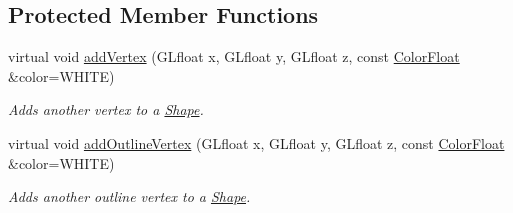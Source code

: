 \subsection*{Protected Member Functions}
\begin{DoxyCompactItemize}
\item 
virtual void \hyperlink{classtsgl_1_1_shape_ac0ea13ecde43ce62262f82597fb94755}{add\+Vertex} (G\+Lfloat x, G\+Lfloat y, G\+Lfloat z, const \hyperlink{structtsgl_1_1_color_float}{Color\+Float} \&color=W\+H\+I\+TE)
\begin{DoxyCompactList}\small\item\em Adds another vertex to a \hyperlink{classtsgl_1_1_shape}{Shape}. \end{DoxyCompactList}\item 
virtual void \hyperlink{classtsgl_1_1_shape_aeb780a6a509ccceae2323508745cd8fd}{add\+Outline\+Vertex} (G\+Lfloat x, G\+Lfloat y, G\+Lfloat z, const \hyperlink{structtsgl_1_1_color_float}{Color\+Float} \&color=W\+H\+I\+TE)
\begin{DoxyCompactList}\small\item\em Adds another outline vertex to a \hyperlink{classtsgl_1_1_shape}{Shape}. \end{DoxyCompactList}\end{DoxyCompactItemize}
